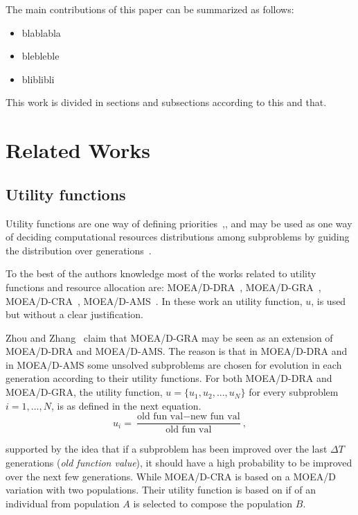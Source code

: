 \documentclass{IEEEtran}
\begin{document}
The main contributions of this paper can be summarized as follows:

\begin{itemize}
	\item blablabla
	\item blebleble
	\item bliblibli
\end{itemize}

This work is divided in sections and subsections according to this and that.

\section{Related Works}

\subsection{Utility functions}


Utility functions are one way of defining priorities~\cite{chankong1983multiobjective},\cite{hansson2005decision},  and may be used as one way of deciding computational resources distributions among subproblems by guiding the distribution over generations~\cite{cai2015external}. 


To the best of the authors knowledge most of the works related to utility functions and resource allocation are: MOEA/D-DRA~\cite{zhang2009performance}, MOEA/D-GRA~\cite{zhou2016all}, MOEA/D-CRA~\cite{kang2018collaborative}, MOEA/D-AMS~\cite{chiang2011moea}. In these work an utility function, $u$, is used but without a clear justification. 

Zhou and Zhang~\cite{zhou2016all} claim that MOEA/D-GRA may be seen as an extension of MOEA/D-DRA and MOEA/D-AMS. The reason is that in MOEA/D-DRA and in MOEA/D-AMS some unsolved subproblems  are chosen for evolution in each generation according to their utility functions. For both MOEA/D-DRA and MOEA/D-GRA, the utility function, $u = \{u_1, u_2, ..., u_N\}$ for every subproblem $i=1,...,N$, is as defined in the next equation.
\begin{equation}\label{utility}
	u_i = \dfrac{\text{old fun val}-\text{new fun val}}{\text{old fun val}},
\end{equation}


supported by the idea that if a subproblem has been improved over the last $\Delta T$ generations (\textit{old function value}), it should have a high probability to be improved over the next few generations. While MOEA/D-CRA is based on a MOEA/D variation with two populations. Their utility function is based on if of an individual from population $A$ is selected to compose the population $B$.
\end{document}

